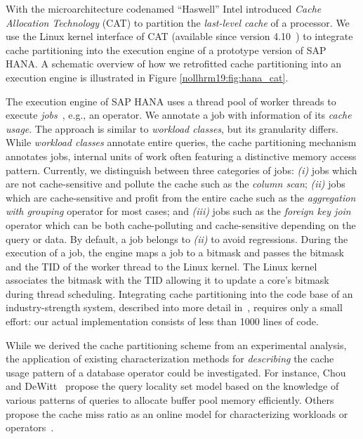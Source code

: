 \documentclass[11pt,dvipdfm]{article}
\begin{document}
With the microarchitecture codenamed ``Haswell'' Intel introduced \emph{Cache Allocation Technology} (CAT) \cite{nollhrm19:Intel:2015:CAT:whitepaper} to partition the \emph{last-level cache} of a processor.
We use the Linux kernel interface of CAT (available since version 4.10~\cite{nollhrm19:Intel:2017:CAT:Kernel}) to integrate cache partitioning into the execution engine of a prototype version of SAP HANA\@.
A schematic overview of how we retrofitted cache partitioning into an execution engine is illustrated in Figure \ref{nollhrm19:fig:hana_cat}.

The execution engine of SAP HANA uses a thread pool of worker threads to execute \emph{jobs}~\cite{nollhrm19:Psaroudakis:2015:SUC:2824032.2824043}, e.g., an operator.
We annotate a job with information of its \emph{cache usage}.
The approach is similar to \emph{workload classes}, but its granularity differs.
While \emph{workload classes} annotate entire queries, the cache partitioning mechanism annotates jobs, internal units of work often featuring a distinctive memory access pattern.
Currently, we distinguish between three categories of jobs:
\textit{(i)} jobs which are not cache-sensitive and pollute the cache such as the \emph{column scan};
\textit{(ii)} jobs which are cache-sensitive and profit from the entire cache such as the \emph{aggregation with grouping} operator for most cases; and
\textit{(iii)} jobs such as the \emph{foreign key join} operator which can be both cache-polluting and cache-sensitive depending on the query or data.
By default, a job belongs to \textit{(ii)} to avoid regressions.
During the execution of a job, the engine maps a job to a bitmask and passes the bitmask and the TID of the worker thread to the Linux kernel.
The Linux kernel associates the bitmask with the TID allowing it to update a core's bitmask during thread scheduling.
Integrating cache partitioning into the code base of an industry-strength system, described into more detail in~\cite{nollhrm19:Noll:2018}, requires only a small effort: our actual implementation consists of less than 1000 lines of code.

While we derived the cache partitioning scheme from an experimental analysis, the application of existing characterization methods for \emph{describing} the cache usage pattern of a database operator could be investigated.
For instance, Chou and DeWitt~\cite{nollhrm19:Chou:1985:EBM:1286760.1286772} propose the query locality set model based on the knowledge of various patterns of queries to allocate buffer pool memory efficiently.
Others propose the cache miss ratio as an online model for characterizing workloads or operators~\cite{nollhrm19:Tam:2009:RAL:1508244.1508259, nollhrm19:Manegold:2002:GDC:1287369.1287387, nollhrm19:Zhou:2004:DTP:1024393.1024415}.
\end{document}
